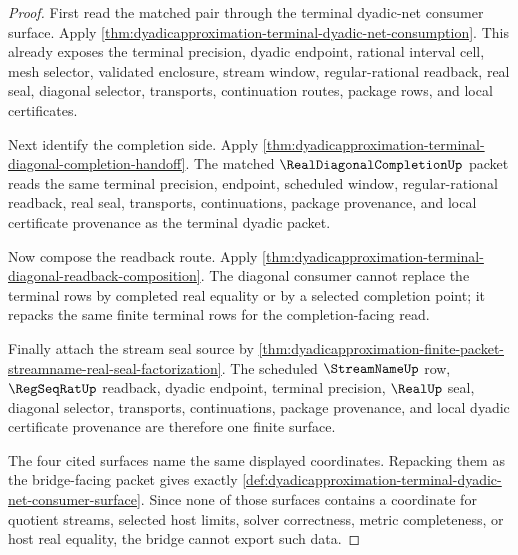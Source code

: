 \begin{proof}
First read the matched pair through the terminal dyadic-net consumer
surface. Apply
\autoref{thm:dyadicapproximation-terminal-dyadic-net-consumption}. This
already exposes the terminal precision, dyadic endpoint, rational interval
cell, mesh selector, validated enclosure, stream window, regular-rational
readback, real seal, diagonal selector, transports, continuation routes,
package rows, and local certificates.

Next identify the completion side. Apply
\autoref{thm:dyadicapproximation-terminal-diagonal-completion-handoff}. The
matched $\RealDiagonalCompletionUp$ packet reads the same terminal
precision, endpoint, scheduled window, regular-rational readback, real seal,
transports, continuations, package provenance, and local certificate
provenance as the terminal dyadic packet.

Now compose the readback route. Apply
\autoref{thm:dyadicapproximation-terminal-diagonal-readback-composition}.
The diagonal consumer cannot replace the terminal rows by completed real
equality or by a selected completion point; it repacks the same finite
terminal rows for the completion-facing read.

Finally attach the stream seal source by
\autoref{thm:dyadicapproximation-finite-packet-streamname-real-seal-factorization}.
The scheduled $\StreamNameUp$ row, $\RegSeqRatUp$ readback, dyadic endpoint,
terminal precision, $\RealUp$ seal, diagonal selector, transports,
continuations, package provenance, and local dyadic certificate provenance
are therefore one finite surface.

The four cited surfaces name the same displayed coordinates. Repacking them
as the bridge-facing packet gives exactly
\autoref{def:dyadicapproximation-terminal-dyadic-net-consumer-surface}. Since
none of those surfaces contains a coordinate for quotient streams, selected
host limits, solver correctness, metric completeness, or host real equality,
the bridge cannot export such data.
\end{proof}
